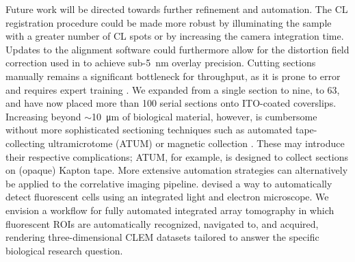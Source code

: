 Future work will be directed towards further refinement and automation. The CL registration procedure could be made more robust by illuminating the sample with a greater number of CL spots or by increasing the camera integration time. Updates to the alignment software could furthermore allow for the distortion field correction used in \textcite{haring2017automated} to achieve sub-\SI{5}{\nano\meter} overlay precision. Cutting sections manually remains a significant bottleneck for throughput, as it is prone to error and requires expert training \cite{wanner2015challenges}. We expanded from a single section to nine, to 63, and have now placed more than 100 serial sections onto ITO-coated coverslips. Increasing beyond ${\sim}$\SI{10}{\micro\meter} of biological material, however, is cumbersome without more sophisticated sectioning techniques such as automated tape-collecting ultramicrotome (ATUM) \cite{hayworth2014imaging} or magnetic collection \cite{templier2019magc}. These may introduce their respective complications; ATUM, for example, is designed to collect sections on (opaque) Kapton tape. More extensive automation strategies can alternatively be applied to the correlative imaging pipeline. \textcite{delpiano2018automated} devised a way to automatically detect fluorescent cells using an integrated light and electron microscope. We envision a workflow for fully automated integrated array tomography in which fluorescent ROIs are automatically recognized, navigated to, and acquired, rendering three-dimensional CLEM datasets tailored to answer the specific biological research question.
